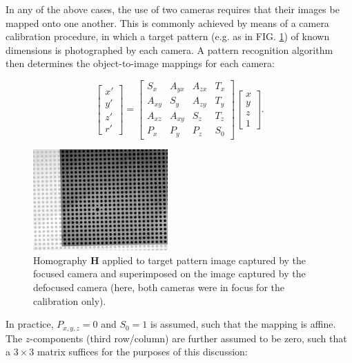 \documentclass[floatfix,aip,rsi,reprint,graphicx]{revtex4-1}
\begin{document}
In any of the above cases, the use of two cameras requires that their images be
mapped onto one another. This is commonly achieved by means of a camera
calibration procedure, in which a target pattern (e.g. as in FIG.
\ref{fig:plate-calibration}) of known dimensions is
photographed by each camera. A pattern recognition algorithm then determines the
object-to-image mappings for each camera:

\begin{equation}
\left[\begin{array}{c} x'\\ y'\\ z'\\ r' \end{array} \right]
=
\left[ \begin{array}{cccc}
S_x & A_{yx} & A_{zx} & T_x \\
A_{xy} & S_y & A_{zy} & T_y \\
A_{xz} & A_{xy} & S_z & T_z \\
P_x & P_y & P_z & S_0
\end{array} \right]
\left[ \begin{array}{c} x\\ y \\ z \\ 1 \end{array} \right].
\end{equation}
\begin{figure}
    \centering
    \includegraphics[width=0.46\textwidth]{orb_images/plate-calibration.jpg}
    \caption{Homography $\mathbf{H}$ applied to target pattern image captured by
        the focused camera and superimposed on the image captured by the
        defocused camera (here, both cameras were in focus for the calibration
        only).
    \label{fig:plate-calibration}}
\end{figure}
In practice, $P_{x,y,z} = 0$ and $S_0 = 1$ is assumed, such that the mapping is
affine. The $z$-components (third row/column) are further assumed to be zero,
such that a $3 \times 3$ matrix suffices for the purposes of this discussion:
\end{document}

